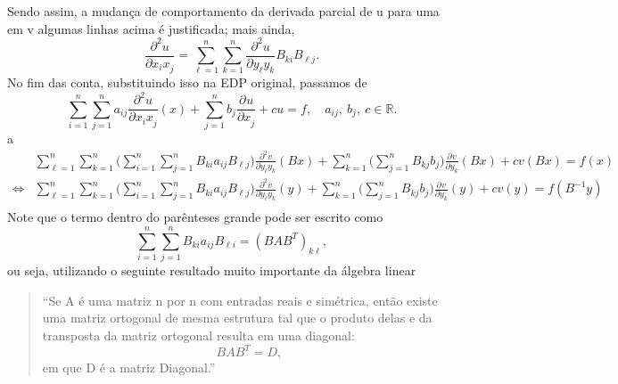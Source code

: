 \documentclass[.../pde_notes.tex]{subfiles}
\begin{document}
Sendo assim, a mudança de comportamento da derivada parcial de u para uma em v algumas linhas acima é justificada; mais ainda,
\[
	\frac{\partial^{2}u}{\partial x_{i}x_{j}^{}} = \sum\limits_{\ell=1}^{n}\sum\limits_{k=1}^{n}\frac{\partial^{2}u}{\partial y_{\ell}y_{k}^{}}B_{ki}B_{\ell j}.
\]
No fim das conta, substituindo isso na EDP original, passamos de
\[
	\sum\limits_{i=1}^{n}\sum\limits_{j=1}^{n}a_{ij}\frac{\partial^{2}u}{\partial x_{i}x_{j}^{}}(x) + \sum\limits_{j=1}^{n}b_{j}\frac{\partial^{}u}{\partial x_{j}^{}} + cu = f,\quad a_{ij},\: b_{j}, \: c\in \mathbb{R}.
\]
a
\begin{align*}
	                & \sum\limits_{\ell =1}^{n}\sum\limits_{k=1}^{n}\biggl(\sum\limits_{i=1}^{n}\sum\limits_{j=1}^{n}B_{ki}a_{ij}B_{\ell j}\biggr)\frac{\partial^{2}v}{\partial y_{\ell }y_{k}^{}}(Bx) + \sum\limits_{k=1}^{n}\biggl(\sum\limits_{j=1}^{n}B_{kj}b_{j}\biggr)\frac{\partial^{}v}{\partial y_{k}^{}}(Bx) + cv(Bx) = f(x)    \\
	\Leftrightarrow & \sum\limits_{\ell =1}^{n}\sum\limits_{k=1}^{n}\biggl(\sum\limits_{i=1}^{n}\sum\limits_{j=1}^{n}B_{ki}a_{ij}B_{\ell j}\biggr)\frac{\partial^{2}v}{\partial y_{\ell }y_{k}^{}}(y) + \sum\limits_{k=1}^{n}\biggl(\sum\limits_{j=1}^{n}B_{kj}b_{j}\biggr)\frac{\partial^{}v}{\partial y_{k}^{}}(y) + cv(y) = f(B^{-1}y) \\
\end{align*}
Note que o termo dentro do parênteses grande pode ser escrito como
\[
	\sum\limits_{i=1}^{n}\sum\limits_{j=1}^{n}B_{ki}a_{ij}B_{\ell i} = (BAB^{T})_{k\ell },
\]
ou seja, utilizando o seguinte resultado muito importante da álgebra linear
\begin{quote}
	``Se A é uma matriz n por n com entradas reais e simétrica, então existe uma matriz ortogonal de mesma estrutura tal que o produto delas e da transposta da matriz ortogonal resulta em uma diagonal:
	\[
		BAB^{T} = D,
	\]
	em que D é a matriz Diagonal.''
\end{quote}
\end{document}
